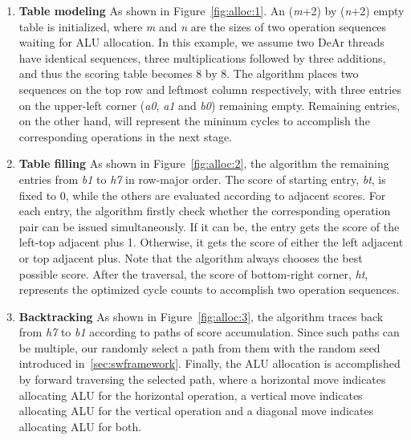\begin{enumerate}
    \item \textbf{Table modeling} As shown in Figure~\ref{fig:alloc:1}. An (\textit{m}+2) by (\textit{n}+2) empty table is initialized, 
        where \textit{m} and \textit{n} are the sizes of two operation sequences waiting for ALU allocation.
        In this example, we assume two DeAr threads have identical sequences, three multiplications followed by three additions, 
        and thus the scoring table becomes 8 by 8.
        The algorithm places two sequences on the top row and leftmost column respectively, 
        with three entries on the upper-left corner (\textit{a0}, \textit{a1} and \textit{b0}) remaining empty. 
        Remaining entries, on the other hand, will represent the mininum cycles to accomplish the corresponding operations in the next stage.
    \item \textbf{Table filling} As shown in Figure~\ref{fig:alloc:2}, the algorithm the remaining entries from \textit{b1} to \textit{h7} in row-major order.
        The score of starting entry, \textit{bt}, is fixed to 0, while the others are evaluated according to adjacent scores.
        For each entry, the algorithm firstly check whether the corresponding operation pair can be issued simultaneously.
        If it can be, the entry gets the score of the left-top adjacent plus 1.
        Otherwise, it gets the score of either the left adjacent or top adjacent plus.
        Note that the algorithm always chooses the best possible score.
        After the traversal, the score of bottom-right corner, \textit{ht}, represents the optimized cycle counts to accomplish two operation sequences.
    \item \textbf{Backtracking} As shown in Figure~\ref{fig:alloc:3}, the algorithm traces back from \textit{h7} to \textit{b1} according to paths of score accumulation.
        Since such paths can be multiple, our randomly select a path from them with the random seed introduced in~\ref{sec:swframework}.
        Finally, the ALU allocation is accomplished by forward traversing the selected path, 
        where a horizontal move indicates allocating ALU for the horizontal operation,
        a vertical move indicates allocating ALU for the vertical operation and a diagonal move indicates allocating ALU for both.
\end{enumerate}
\vspace{\textfig}
